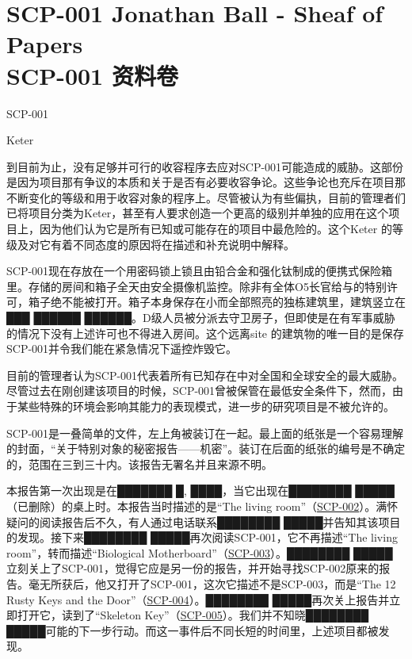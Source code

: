 \chapter[SCP-001 资料卷]{
	SCP-001 Jonathan Ball - Sheaf of Papers \\
	SCP-001 资料卷
}

\label{chap:SCP-001.sheaf.of.papers}

SCP-001

Keter

到目前为止，没有足够并可行的收容程序去应对SCP-001可能造成的威胁。这部份是因为项目那有争议的本质和关于是否有必要收容争论。这些争论也充斥在项目那不断变化的等级和用于收容对象的程序上。尽管被认为有些偏执，目前的管理者们已将项目分类为Keter，甚至有人要求创造一个更高的级别并单独的应用在这个项目上，因为他们认为它是所有已知或可能存在的项目中最危险的。这个Keter 的等级及对它有着不同态度的原因将在描述和补充说明中解释。

SCP-001现在存放在一个用密码锁上锁且由铅合金和强化钛制成的便携式保险箱里。存储的房间和箱子全天由安全摄像机监控。除非有全体O5长官给与的特别许可，箱子绝不能被打开。箱子本身保存在小而全部照亮的独栋建筑里，建筑竖立在███ ██████ ██████。D级人员被分派去守卫房子，但即使是在有军事威胁的情况下没有上述许可也不得进入房间。这个远离site 的建筑物的唯一目的是保存SCP-001并令我们能在紧急情况下遥控炸毁它。

目前的管理者认为SCP-001代表着所有已知存在中对全国和全球安全的最大威胁。尽管过去在刚创建该项目的时候，SCP-001曾被保管在最低安全条件下，然而，由于某些特殊的环境会影响其能力的表现模式，进一步的研究项目是不被允许的。

SCP-001是一叠简单的文件，左上角被装订在一起。最上面的纸张是一个容易理解的封面，“关于特别对象的秘密报告——机密”。装订在后面的纸张的编号是不确定的，范围在三到三十内。该报告无署名并且来源不明。

本报告第一次出现是在███████ █, ████，当它出现在████████ █████（已删除）的桌上时。本报告当时描述的是“The living room”（\hyperref[chap:SCP-002]{SCP-002}）。满怀疑问的阅读报告后不久，有人通过电话联系████████ █████并告知其该项目的发现。接下来████████ █████再次阅读SCP-001，它不再描述“The living room”，转而描述“Biological Motherboard”（\hyperref[chap:SCP-003]{SCP-003}）。████████ █████ 立刻关上了SCP-001，觉得它应是另一份的报告，并开始寻找SCP-002原来的报告。毫无所获后，他又打开了SCP-001，这次它描述不是SCP-003，而是“The 12 Rusty Keys and the Door”（\hyperref[chap:SCP-004]{SCP-004}）。████████ █████再次关上报告并立即打开它，读到了“Skeleton Key”（\hyperref[chap:SCP-005]{SCP-005}）。我们并不知晓████████ █████可能的下一步行动。而这一事件后不同长短的时间里，上述项目都被发现。


